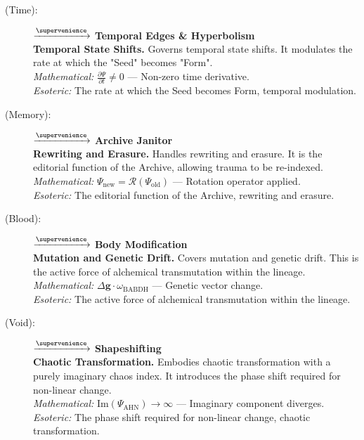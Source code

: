 \begin{description}
    \item[(Time):] \fetumahd $\xrightarrow{\supervenience}$ \textbf{Temporal Edges \& Hyperbolism} \\
    \textbf{Temporal State Shifts.} Governs temporal state shifts. It modulates the rate at which the "Seed" becomes "Form". \\
    \textit{Mathematical:} $\frac{\partial \Psi}{\partial t} \neq 0$ — Non-zero time derivative. \\
    \textit{Esoteric:} The rate at which the Seed becomes Form, temporal modulation.

    \item[(Memory):] \kallor $\xrightarrow{\supervenience}$ \textbf{Archive Janitor} \\
    \textbf{Rewriting and Erasure.} Handles rewriting and erasure. It is the editorial function of the Archive, allowing trauma to be re-indexed. \\
    \textit{Mathematical:} $\Psi_{\text{new}} = \mathcal{R}(\Psi_{\text{old}})$ — Rotation operator applied. \\
    \textit{Esoteric:} The editorial function of the Archive, rewriting and erasure.

    \item[(Blood):] \babdhoro $\xrightarrow{\supervenience}$ \textbf{Body Modification} \\
    \textbf{Mutation and Genetic Drift.} Covers mutation and genetic drift. This is the active force of alchemical transmutation within the lineage. \\
    \textit{Mathematical:} $\Delta \mathbf{g} \cdot \omega_{\text{BABDH}}$ — Genetic vector change. \\
    \textit{Esoteric:} The active force of alchemical transmutation within the lineage.

    \item[(Void):] \ahnuth $\xrightarrow{\supervenience}$ \textbf{Shapeshifting} \\
    \textbf{Chaotic Transformation.} Embodies chaotic transformation with a purely imaginary chaos index. It introduces the phase shift required for non-linear change. \\
    \textit{Mathematical:} $\text{Im}(\Psi_{\text{AHN}}) \to \infty$ — Imaginary component diverges. \\
    \textit{Esoteric:} The phase shift required for non-linear change, chaotic transformation.


\end{description}
